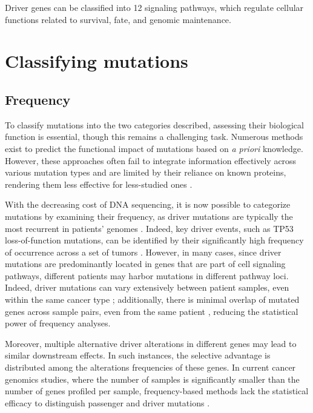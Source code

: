 Driver genes can be classified into 12 signaling pathways, which regulate cellular functions related to survival, fate, and genomic maintenance. 

\section{Classifying mutations}

\subsection{Frequency}

To classify mutations into the two categories described, assessing their biological function is essential, though this remains a challenging task. Numerous methods exist to predict the functional impact of mutations based on \textit{a priori} knowledge. However, these approaches often fail to integrate information effectively across various mutation types and are limited by their reliance on known proteins, rendering them less effective for less-studied ones \cite{multi-dendrix}.

With the decreasing cost of DNA sequencing, it is now possible to categorize mutations by examining their frequency, as driver mutations are typically the most recurrent in patients' genomes \cite{multi-dendrix}. Indeed, key driver events, such as TP53 loss-of-function mutations, can be identified by their significantly high frequency of occurrence across a set of tumors \cite{mutex}. However, in many cases, since driver mutations are predominantly located in genes that are part of cell signaling pathways, different patients may harbor mutations in different pathway loci. Indeed, driver mutations can vary extensively between patient samples, even within the same cancer type \cite{multi-dendrix}; additionally, there is minimal overlap of mutated genes across sample pairs, even from the same patient \cite{mdpfinder}, reducing the statistical power of frequency analyses.

Moreover, multiple alternative driver alterations in different genes may lead to similar downstream effects. In such instances, the selective advantage is distributed among the alterations frequencies of these genes. In current cancer genomics studies, where the number of samples is significantly smaller than the number of genes profiled per sample, frequency-based methods lack the statistical efficacy to distinguish passenger and driver mutations \cite{mutex}. 

